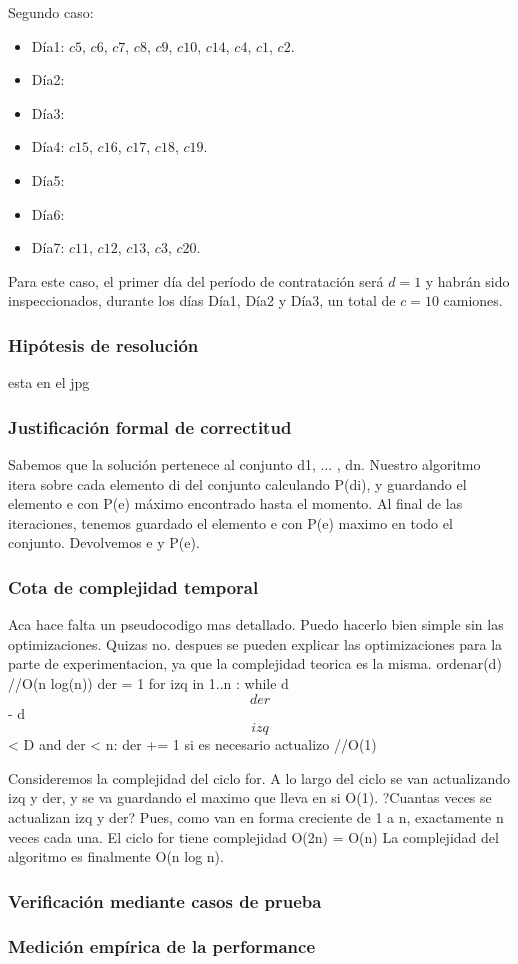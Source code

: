\documentclass[11pt, a4paper, twoside]{article}
\begin{document}
Segundo caso:

\begin{itemize}
\item D\'ia1: $c5$, $c6$, $c7$, $c8$, $c9$, $c10$, $c14$, $c4$, $c1$, $c2$. 
\item D\'ia2:  
\item D\'ia3: 
\item D\'ia4: $c15$, $c16$, $c17$, $c18$, $c19$. 
\item D\'ia5: 
\item D\'ia6: 
\item D\'ia7: $c11$, $c12$, $c13$, $c3$, $c20$.
\end{itemize}  

Para este caso, el primer d\'ia del per\'iodo de contrataci\'on ser\'a $d=1$ y habr\'an sido inspeccionados, durante los d\'ias D\'ia1, D\'ia2 y D\'ia3, un total de $c=10$ camiones. 

\subsubsection{Hipótesis de resolución}
esta en el jpg
\subsubsection{Justificación formal de correctitud}
Sabemos que la soluci\'on pertenece al conjunto {d1, ... , dn}. Nuestro algoritmo itera sobre cada elemento di del conjunto calculando P(di), y guardando el elemento e con P(e) m\'aximo encontrado hasta el momento. Al final de las iteraciones, tenemos guardado el elemento e con P(e) maximo en todo el conjunto. Devolvemos e y P(e).
\subsubsection{Cota de complejidad temporal}
Aca hace falta un pseudocodigo mas detallado. Puedo hacerlo bien simple sin las optimizaciones. Quizas no. despues se pueden explicar las optimizaciones para la parte de experimentacion, ya que la complejidad teorica es la misma.
ordenar(d) //O(n log(n))
der = 1
for izq in 1..n :
    while d\[der\] - d\[izq\] < D and der < n:
        der += 1
    si es necesario actualizo //O(1)

Consideremos la complejidad del ciclo for. A lo largo del ciclo se van actualizando izq y der, y se va guardando el maximo que lleva  en si O(1).
?Cuantas veces se actualizan izq y der? Pues, como van en forma creciente de 1 a n, exactamente n veces cada una. El ciclo for tiene complejidad O(2n) = O(n)
La complejidad del algoritmo es finalmente O(n log n).

\subsubsection{Verificación mediante casos de prueba}

\subsubsection{Medición empírica de la performance}

\end{document}

